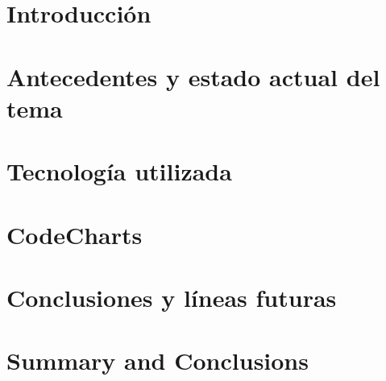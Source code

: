 \documentclass[spanish,a4paper,14pt,oneside]{extreport}
\begin{document}
   
  \chapter{Introducción}
  \label{chapter:intro}
   
  
   
   
  \chapter{Antecedentes y estado actual del tema}
  \label{chapter:Estadodelarte}
   
  
   
  \newpage{\pagestyle{empty}}
  \thispagestyle{empty}
   
  \chapter{Tecnología utilizada}
  \label{chapter:tres}
   
  
   
   
  \chapter{CodeCharts}
  \label{chapter:cuatro}
   
  
   
  \newpage{\pagestyle{empty}}
  \thispagestyle{empty}
   
  \chapter{Conclusiones y líneas futuras}
  \label{chapter:Conclusiones}
   
  
   
  \newpage{\pagestyle{empty}}
  \thispagestyle{empty}
   
  \chapter{Summary and Conclusions }
  \label{chapter:ingles}
   
\end{document}
